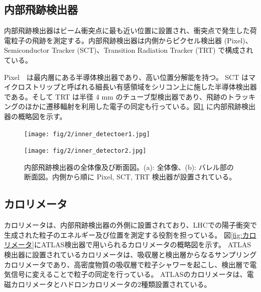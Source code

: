 \subsection{内部飛跡検出器}
内部飛跡検出器はビーム衝突点に最も近い位置に設置され、衝突点で発生した荷電粒子の飛跡を測定する。内部飛跡検出器は内側からピクセル検出器 (Pixel)、Semiconductor Tracker (SCT)、Transition Radiation Tracker (TRT) で構成されている。

Pixel　は最内層にある半導体検出器であり、高い位置分解能を持つ。
SCT はマイクロストリップと呼ばれる細長い有感領域をシリコン上に施した半導体検出器である。そして TRT は半径 4 mm のチューブ型検出器であり、飛跡のトラッキングのほかに遷移輻射を利用した電子の同定も行っている。図\ref{fig:内部飛跡検出器} に内部飛跡検出器の概略図を示す。

\begin{figure}
    \centering
    \begin{minipage}[b]{0.4\linewidth}
        \centering
        \texttt{[image: fig/2/inner\_detectoer1.jpg]}
        \vspace{10pt}
        \subcaption{}
        \label{fig:内部飛跡検出器の概略図1}
    \end{minipage}
    \hfill
    \begin{minipage}[b]{0.5\linewidth}
        \centering
        \texttt{[image: fig/2/inner\_detector2.jpg]}
        \vspace{10pt}
        \subcaption{}
        \label{fig:内部飛跡検出器の概略図2}
    \end{minipage}
    \caption{内部飛跡検出器の全体像及び断面図。(a): 全体像、(b): バレル部の断面図。内側から順に Pixel, SCT, TRT 検出器が設置されている。}
    \label{fig:内部飛跡検出器}
\end{figure}



\subsection{カロリメータ}
カロリメータは、内部飛跡検出器の外側に設置されており、LHCでの陽子衝突で生成された粒子のエネルギー及び位置を測定する役割を担っている。
図\ref{fig:カロリメータ}にATLAS検出器で用いられるカロリメータの概略図を示す。
ATLAS検出器に設置されているカロリメータは、吸収層と検出層からなるサンプリングカロリメータであり、高密度物質の吸収層で粒子シャワーを起こし、検出層で電気信号に変えることで粒子の同定を行っている。
ATLASのカロリメータは、電磁カロリメータとハドロンカロリメータの2種類設置されている。


